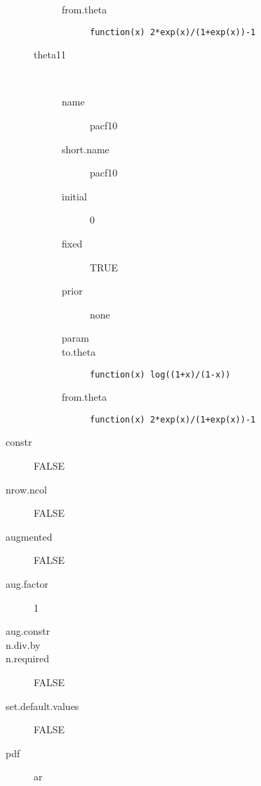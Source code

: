 \begin{description}
\begin{description}
\begin{description}
	 	 	 \item[ from.theta ] \verb|function(x) 2*exp(x)/(1+exp(x))-1| 
	 	 \end{description}
	 	\item[theta11]\ 
	 	 \begin{description}
	 	 	 \item[ name ] pacf10 
	 	 	 \item[ short.name ] pacf10 
	 	 	 \item[ initial ] 0 
	 	 	 \item[ fixed ] TRUE 
	 	 	 \item[ prior ] none 
	 	 	 \item[ param ]  
	 	 	 \item[ to.theta ] \verb|function(x) log((1+x)/(1-x))| 
	 	 	 \item[ from.theta ] \verb|function(x) 2*exp(x)/(1+exp(x))-1| 
	 	 \end{description}
	 \end{description}
	 \item[ constr ] FALSE 
	 \item[ nrow.ncol ] FALSE 
	 \item[ augmented ] FALSE 
	 \item[ aug.factor ] 1 
	 \item[ aug.constr ]  
	 \item[ n.div.by ]  
	 \item[ n.required ] FALSE 
	 \item[ set.default.values ] FALSE 
	 \item[ pdf ] ar 
\end{description}
